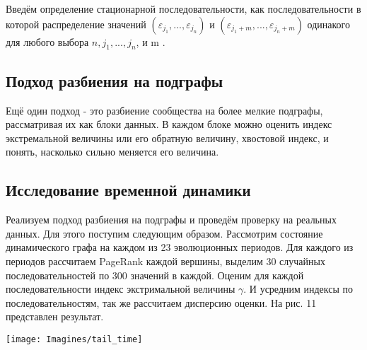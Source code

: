 \documentclass[a4paper,12pt]{article}
\begin{document}
	Введём определение стационарной последовательности, как последовательности в которой распределение значений $(\varepsilon_{j_{1}},..., \varepsilon_{j_{n}})$  и $(\varepsilon_{j_{1}+m},..., \varepsilon_{j_{n}+m})$ одинакого для любого выбора $n, j_{1},...,j_{n}$, и m \cite{book7}.
	

\subsection{Подход разбиения на подграфы}
	Ещё один подход - это разбиение сообщества на более мелкие подграфы, рассматривая их как блоки данных. В каждом блоке можно оценить индекс экстремальной величины или его обратную величину, хвостовой индекс, и понять, насколько сильно меняется его величина. 
 
	
\subsection{Исследование временной динамики}
	
Реализуем подход разбиения на подграфы и проведём проверку на реальных данных. Для этого поступим следующим образом. Рассмотрим состояние динамического графа на каждом из 23 эволюционных периодов. Для каждого из периодов рассчитаем  PageRank каждой вершины, выделим 30 случайных последовательностей по 300 значений в каждой. Оценим для каждой последовательности индекс экстримальной величины $\gamma$. И усредним индексы по последовательностям, так же рассчитаем дисперсию оценки. На рис. 11 представлен результат.

 \begin{center}
\centering 
\texttt{[image: Imagines/tail\_time]}
\end{center}
\end{document}
